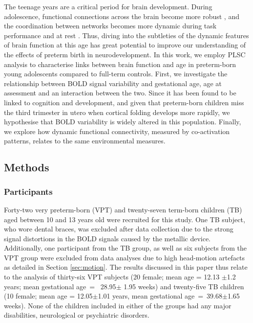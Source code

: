   
     The teenage years are a critical period for brain development. During adolescence, functional connections across the brain become more robust \citep{Power2010}, and the coordination between networks becomes more dynamic during task performance \citep{Hutchison2015} and at rest \citep{Marusak2017, Faghiri2018}. Thus, diving into the subtleties of the dynamic features of brain function at this age has great potential to improve our understanding of the effects of preterm birth in neurodevelopment. In this work, we employ PLSC analysis to characterise links between brain function and age in preterm-born young adolescents compared to full-term controls. First, we investigate the relationship between BOLD signal variability and gestational age, age at assessment and an interaction between the two. Since it has been found to be linked to cognition and development, and given that preterm-born children miss the third trimester in utero when cortical folding develops more rapidly, we hypothesise that BOLD variability is widely altered in this population. Finally, we explore how dynamic functional connectivity, measured by co-activation patterns, relates to the same environmental measures. 




\subsection{Methods}

\subsubsection{Participants}
Forty-two very preterm-born (VPT) and twenty-seven term-born children (TB) aged between 10 and 13 years old were recruited for this study. One TB subject, who wore dental braces, was excluded after data collection due to the strong signal distortions in the BOLD signals caused by the metallic device. Additionally, one participant from the TB group, as well as six subjects from the VPT group were excluded from data analyses due to high head-motion artefacts as detailed in Section \ref{sec:motion}. The results discussed in this paper thus relate to the analysis of thirty-six VPT subjects (20 female; mean age = 12.13 $\pm$1.2 years; mean gestational age~=~ 28.95$\pm$ 1.95 weeks) and twenty-five TB children (10 female; mean age = 12.05$\pm$1.01 years, mean gestational age~=~39.68$\pm$1.65 weeks). None of the children included in either of the groups had any major disabilities, neurological or psychiatric disorders.    

